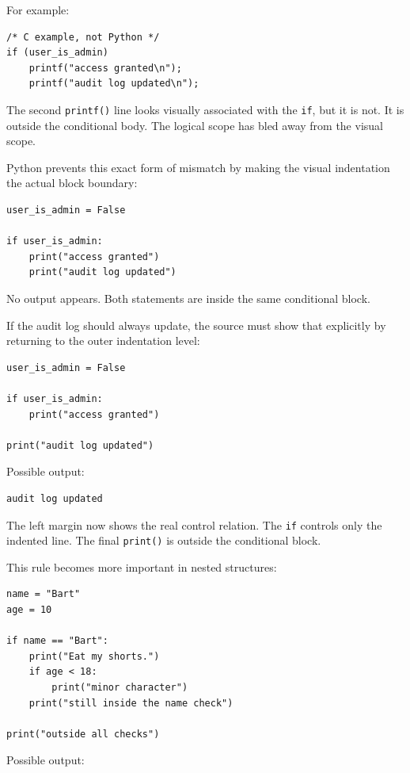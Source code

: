For example:

\begin{verbatim}
/* C example, not Python */
if (user_is_admin)
    printf("access granted\n");
    printf("audit log updated\n");
\end{verbatim}

The second \texttt{printf()} line looks visually associated with the \texttt{if}, but it is not. It is outside the conditional body. The logical scope has bled away from the visual scope.

Python prevents this exact form of mismatch by making the visual indentation the actual block boundary:

\begin{verbatim}
user_is_admin = False

if user_is_admin:
    print("access granted")
    print("audit log updated")
\end{verbatim}

No output appears. Both statements are inside the same conditional block.

If the audit log should always update, the source must show that explicitly by returning to the outer indentation level:

\begin{verbatim}
user_is_admin = False

if user_is_admin:
    print("access granted")

print("audit log updated")
\end{verbatim}

Possible output:

\begin{verbatim}
audit log updated
\end{verbatim}

The left margin now shows the real control relation. The \texttt{if} controls only the indented line. The final \texttt{print()} is outside the conditional block.

This rule becomes more important in nested structures:

\begin{verbatim}
name = "Bart"
age = 10

if name == "Bart":
    print("Eat my shorts.")
    if age < 18:
        print("minor character")
    print("still inside the name check")

print("outside all checks")
\end{verbatim}

Possible output:


